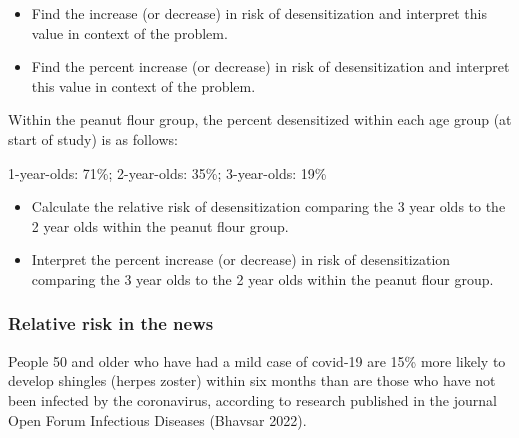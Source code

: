 \documentclass[
]{report}
\providecommand{\tightlist}{%
  \setlength{\itemsep}{0pt}\setlength{\parskip}{0pt}}
\begin{document}
\vspace{0.6in}

\begin{itemize}
\tightlist
\item
  Find the increase (or decrease) in risk of desensitization and interpret this value in context of the problem.
\end{itemize}

\vspace{1in}

\begin{itemize}
\tightlist
\item
  Find the percent increase (or decrease) in risk of desensitization and interpret this value in context of the problem.
\end{itemize}

\vspace{1in}

Within the peanut flour group, the percent desensitized within each age group (at start of study) is as follows:

1-year-olds: 71\%; 2-year-olds: 35\%; 3-year-olds: 19\%

\begin{itemize}
\tightlist
\item
  Calculate the relative risk of desensitization comparing the 3 year olds to the 2 year olds within the peanut flour group.
\end{itemize}

\vspace{0.8in}

\begin{itemize}
\tightlist
\item
  Interpret the percent increase (or decrease) in risk of desensitization comparing the 3 year olds to the 2 year olds within the peanut flour group.
\end{itemize}

\vspace{0.8in}

\subsubsection*{Relative risk in the news}\label{relative-risk-in-the-news}

People 50 and older who have had a mild case of covid-19 are 15\% more likely to develop shingles (herpes zoster) within six months than are those who have not been infected by the coronavirus, according to research published in the journal Open Forum Infectious Diseases (Bhavsar 2022).
\end{document}
